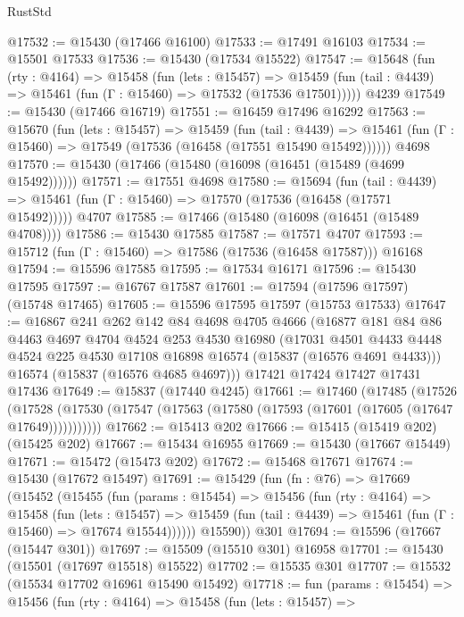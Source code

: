 \begin{lexlean}{RustStd}
\begin{coremodule}
@17532 := @15430 (@17466 @16100)
@17533 := @17491 @16103
@17534 := @15501 @17533
@17536 := @15430 (@17534 @15522)
@17547 := @15648
    (fun (rty : @4164) =>
    @15458
      (fun (lets : @15457) =>
      @15459 (fun (tail : @4439) => @15461 (fun (Γ : @15460) => @17532 (@17536 @17501)))))
    @4239
@17549 := @15430 (@17466 @16719)
@17551 := @16459 @17496 @16292
@17563 := @15670
    (fun (lets : @15457) =>
    @15459
      (fun (tail : @4439) =>
      @15461 (fun (Γ : @15460) => @17549 (@17536 (@16458 (@17551 @15490 @15492))))))
    @4698
@17570 := @15430 (@17466 (@15480 (@16098 (@16451 (@15489 (@4699 @15492))))))
@17571 := @17551 @4698
@17580 := @15694
    (fun (tail : @4439) => @15461 (fun (Γ : @15460) => @17570 (@17536 (@16458 (@17571 @15492)))))
    @4707
@17585 := @17466 (@15480 (@16098 (@16451 (@15489 @4708))))
@17586 := @15430 @17585
@17587 := @17571 @4707
@17593 := @15712 (fun (Γ : @15460) => @17586 (@17536 (@16458 @17587))) @16168
@17594 := @15596 @17585
@17595 := @17534 @16171
@17596 := @15430 @17595
@17597 := @16767 @17587
@17601 := @17594 (@17596 @17597) (@15748 @17465)
@17605 := @15596 @17595 @17597 (@15753 @17533)
@17647 := @16867
    @241
    @262
    @142
    @84
    @4698
    @4705
    @4666
    (@16877
      @181
      @84
      @86
      @4463
      @4697
      @4704
      @4524
      @253
      @4530
      @16980
      (@17031 @4501 @4433 @4448 @4524 @225 @4530 @17108 @16898 @16574 (@15837 (@16576 @4691 @4433)))
      @16574
      (@15837 (@16576 @4685 @4697)))
    @17421
    @17424
    @17427
    @17431
    @17436
@17649 := @15837 (@17440 @4245)
@17661 := @17460
    (@17485
      (@17526
        (@17528 (@17530 (@17547 (@17563 (@17580 (@17593 (@17601 (@17605 (@17647 @17649)))))))))))
@17662 := @15413 @202
@17666 := @15415 (@15419 @202) (@15425 @202)
@17667 := @15434 @16955
@17669 := @15430 (@17667 @15449)
@17671 := @15472 (@15473 @202)
@17672 := @15468 @17671
@17674 := @15430 (@17672 @15497)
@17691 := @15429
    (fun (fn : @76) =>
    @17669
      (@15452
        (@15455
          (fun (params : @15454) =>
          @15456
            (fun (rty : @4164) =>
            @15458
              (fun (lets : @15457) =>
              @15459 (fun (tail : @4439) => @15461 (fun (Γ : @15460) => @17674 @15544))))))
        @15590))
    @301
@17694 := @15596 (@17667 (@15447 @301))
@17697 := @15509 (@15510 @301) @16958
@17701 := @15430 (@15501 (@17697 @15518) @15522)
@17702 := @15535 @301
@17707 := @15532 (@15534 @17702 @16961 @15490 @15492)
@17718 := fun (params : @15454) =>
  @15456
    (fun (rty : @4164) =>
    @15458
      (fun (lets : @15457) =>

\end{coremodule}
\end{lexlean}
